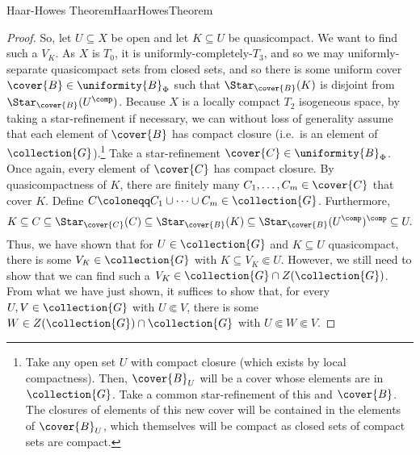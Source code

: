 \begin{thm}{Haar-Howes Theorem}{HaarHowesTheorem}
\begin{proof}
So, let $U\subseteq X$ be open and let $K\subseteq U$ be quasicompact.  We want to find such a $V_K$.  As $X$ is $T_0$, it is uniformly-completely-$T_3$, and so we may uniformly-separate quasicompact sets from closed sets, and so there is some uniform cover $\cover{B}\in \uniformity{B}_\Phi$ such that $\Star _{\cover{B}}(K)$ is disjoint from $\Star _{\cover{B}}(U^{\comp})$.  Because $X$ is a locally compact $T_2$ isogeneous space, by taking a star-refinement if necessary, we can without loss of generality assume that each element of $\cover{B}$ has compact closure (i.e.~is an element of $\collection{G}$).\footnote{Take any open set $U$ with compact closure (which exists by local compactness).  Then, $\cover{B}_U$ will be a cover whose elements are in $\collection{G}$.  Take a common star-refinement of this and $\cover{B}$.  The closures of elements of this new cover will be contained in the elements of $\cover{B}_U$, which themselves will be compact as closed sets of compact sets are compact.}  Take a star-refinement $\cover{C}\in \uniformity{B}_{\Phi}$.  Once again, every element of $\cover{C}$ has compact closure.  By quasicompactness of $K$, there are finitely many $C_1,\ldots ,C_m\in \cover{C}$ that cover $K$.  Define $C\coloneqq C_1\cup \cdots \cup C_m\in \collection{G}$.  Furthermore,
\begin{equation*}
K\subseteq C\subseteq \Star _{\cover{C}}(C)\subseteq \Star _{\cover{B}}(K)\subseteq \Star _{\cover{B}}(U^{\comp})^{\comp}\subseteq U.
\end{equation*}
Thus, we have shown that for $U\in \collection{G}$ and $K\subseteq U$ quasicompact, there is some $V_K\in \collection{G}$ with $K\subseteq V_K\Subset U$.  However, we still need to show that we can find such a $V_K\in \collection{G}\cap Z(\collection{G})$.  From what we have just shown, it suffices to show that, for every $U,V\in \collection{G}$ with $U\Subset V$, there is some $W\in Z(\collection{G})\cap \collection{G}$ with $U\Subset W\Subset V$.


\end{proof}
\end{thm}
